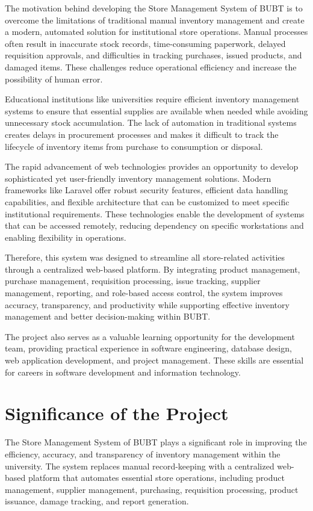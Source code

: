 The motivation behind developing the Store Management System of BUBT is to overcome the limitations of traditional manual inventory management and create a modern, automated solution for institutional store operations. Manual processes often result in inaccurate stock records, time-consuming paperwork, delayed requisition approvals, and difficulties in tracking purchases, issued products, and damaged items. These challenges reduce operational efficiency and increase the possibility of human error.

Educational institutions like universities require efficient inventory management systems to ensure that essential supplies are available when needed while avoiding unnecessary stock accumulation. The lack of automation in traditional systems creates delays in procurement processes and makes it difficult to track the lifecycle of inventory items from purchase to consumption or disposal.

The rapid advancement of web technologies provides an opportunity to develop sophisticated yet user-friendly inventory management solutions. Modern frameworks like Laravel offer robust security features, efficient data handling capabilities, and flexible architecture that can be customized to meet specific institutional requirements. These technologies enable the development of systems that can be accessed remotely, reducing dependency on specific workstations and enabling flexibility in operations.

Therefore, this system was designed to streamline all store-related activities through a centralized web-based platform. By integrating product management, purchase management, requisition processing, issue tracking, supplier management, reporting, and role-based access control, the system improves accuracy, transparency, and productivity while supporting effective inventory management and better decision-making within BUBT.

The project also serves as a valuable learning opportunity for the development team, providing practical experience in software engineering, database design, web application development, and project management. These skills are essential for careers in software development and information technology.

\section{Significance of the Project}

The Store Management System of BUBT plays a significant role in improving the efficiency, accuracy, and transparency of inventory management within the university. The system replaces manual record-keeping with a centralized web-based platform that automates essential store operations, including product management, supplier management, purchasing, requisition processing, product issuance, damage tracking, and report generation.

